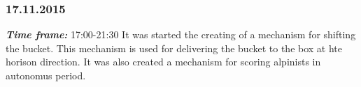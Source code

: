 \subsubsection{17.11.2015}
\textit{\textbf{Time frame:}} 17:00-21:30 \newline
It was started the creating of a mechanism for shifting the bucket. This mechanism is used for delivering the bucket to the box at hte horison direction.
It was also created a mechanism for scoring alpinists in autonomus period.

\begin{figure}[H]
	\begin{minipage}[h]{0.31\linewidth}

\end{minipage}
\end{figure}
